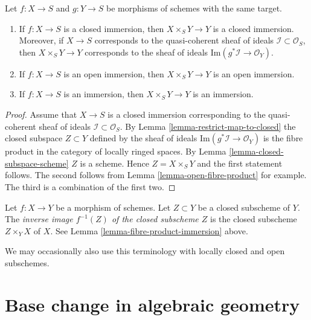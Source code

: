 \begin{lemma}
\label{lemma-fibre-product-immersion}
Let $f : X \to S$ and $g : Y \to S$ be morphisms of schemes
with the same target.
\begin{enumerate}
\item If $f : X \to S$ is a closed immersion,
then $X\times_S Y \to Y$ is a closed immersion.
Moreover, if $X \to S$ corresponds to the quasi-coherent
sheaf of ideals $\mathcal{I} \subset \mathcal{O}_S$, then
$X \times_S Y \to Y$ corresponds to the sheaf of ideals
$\text{Im}(g^*\mathcal{I} \to \mathcal{O}_Y)$.
\item If $f : X \to S$ is an open immersion,
then $X\times_S Y \to Y$ is an open immersion.
\item If $f : X \to S$ is an immersion,
then $X\times_S Y \to Y$ is an immersion.
\end{enumerate}
\end{lemma}

\begin{proof}
Assume that $X \to S$ is a closed immersion corresponding
to the quasi-coherent sheaf of ideals $\mathcal{I} \subset \mathcal{O}_S$.
By Lemma \ref{lemma-restrict-map-to-closed} the closed subspace
$Z \subset Y$ defined by the sheaf of ideals
$\text{Im}(g^*\mathcal{I} \to \mathcal{O}_Y)$ is the fibre product
in the category of locally ringed spaces.
By Lemma \ref{lemma-closed-subspace-scheme} $Z$ is a scheme.
Hence $Z = X \times_S Y$ and the first statement follows.
The second follows from Lemma \ref{lemma-open-fibre-product}
for example. The third is a combination of
the first two.
\end{proof}

\begin{definition}
\label{definition-inverse-image-closed-subscheme}
Let $f : X \to Y$ be a morphism of schemes. Let $Z \subset Y$ be a
closed subscheme of $Y$. The {\it inverse image $f^{-1}(Z)$ of the
closed subscheme $Z$} is the closed subscheme $Z \times_Y X$ of
$X$. See Lemma \ref{lemma-fibre-product-immersion} above.
\end{definition}

\noindent
We may occasionally also use this terminology with locally closed and
open subschemes.









\section{Base change in algebraic geometry}
\label{section-base-change}

